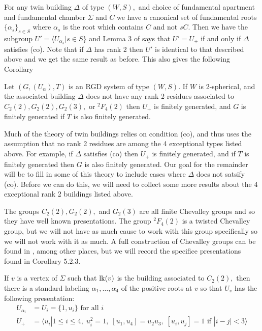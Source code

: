 \documentclass[class=book, crop=false,12 pt]{standalone}
\begin{document}
For any twin building $\Delta$ of type $(W,S),$ and choice of fundamental apartment and fundamental chamber $\Sigma$ and $C$ we have a canonical set of fundamental roots $\{\alpha_s\}_{s\in S}$ where $\alpha_s$ is the root which contains $C$ and not $sC.$ Then we have the subgroup $U'=\langle U_{\alpha_s}|s\in S\}$ and Lemma 3 of \cite{cop} says that $U'=U_+$ if and only if $\Delta$ satisfies (co). Note that if $\Delta$ has rank 2 then $U'$ is identical to that described above and we get the same result as before. This also gives the following Corollary

\begin{cor}
	\label{cor:cofg}
	Let $(G,(U_\alpha),T)$ is an RGD system of type $(W,S).$ If $W$ is 2-spherical, and the associated building $\Delta$ does not have any rank 2 residues associated to $C_2(2),G_2(2),G_2(3),$ or ${}^2F_4(2)$ then $U_+$ is finitely generated, and $G$ is finitely generated if $T$ is also finitely generated.
\end{cor}

Much of the theory of twin buildings relies on condition (co), and thus uses the assumption that no rank 2 residues are among the 4 exceptional types listed above. For example, if $\Delta$ satisfies (co) then $U_+$ is finitely generated, and if $T$ is finitely generated then $G$ is also finitely generated. Our goal for the remainder will be to fill in some of this theory to include cases where $\Delta$ does not satsify (co). Before we can do this, we will need to collect some more results about the 4 exceptional rank 2 buildings listed above.

The groups $C_2(2),G_2(2),$ and $G_2(3)$ are all finite Chevalley groups and so they have well known presentations. The group ${}^2F_4(2)$ is a twisted Chevalley group, but we will not have as much cause to work with this group specifically so we will not work with it as much. A full construction of Chevalley groups can be found in \cite{carter}, among other places, but we will record the specifice presentations found in Corollary 5.2.3.

\begin{lemma}
	\label{lem:c22pres}
	If $v$ is a vertex of $\Sigma$ such that $\mathrm{lk}(v)$ is the building associated to $C_2(2),$ then there is a standard labeling $\alpha_1,\dots,\alpha_4$ of the positive roots at $v$ so that $U_v$ has the following presentation:
	\begin{align*}
		U_{\alpha_i}&=U_i=\{1,u_i\}\text{ for all }i\\
		U_+&=\langle u_i|1\le i\le 4,\;u_i^2=1,\;[u_1,u_4]=u_2u_3,\;[u_i,u_j]=1\text{ if }|i-j|<3\rangle
	\end{align*}
\end{lemma}
\end{document}
